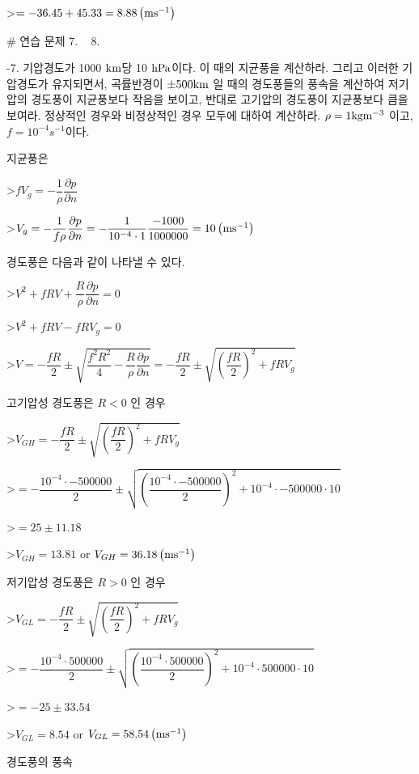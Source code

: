 >$ = -36.45+ 45.33 = 8.88 \left( \rm m s^{-1} \right)$




# 연습 문제 7. ~ 8. 


-7. 기압경도가 1000 $\rm km$당 10 $\rm hPa $이다. 이 때의 지균풍을 계산하라. 그리고 이러한 기압경도가 유지되면서, 곡률반경이 $\pm 500 \rm km$ 일 때의 경도풍들의 풍속을 계산하여 저기압의 경도풍이 지균풍보다 작음을 보이고, 반대로 고기압의 경도풍이 지균풍보다 큼을 보여라. 정상적인 경우와 비정상적인 경우 모두에 대하여 계산하라. $\rho = 1 \rm kg m^{-3}$ 이고, $ f = 10^{-4} s^{-1}$이다. 


지균풍은 

>$f V_{g} = -\dfrac{1}{\rho}\dfrac{\partial p}{\partial n}$ 

>$V_{g} = -\dfrac{1}{f \rho}\dfrac{\partial p}{\partial n} =  -\dfrac{1}{10^{-4} \cdot 1}\dfrac{-1000}{1000000} = 10 \left( \rm m s^{-1} \right)$ 

경도풍은 다음과 같이 나타낼 수 있다.

>$ V^{2} + fRV + \dfrac{R}{\rho} \dfrac{\partial p}{\partial n} = 0$

>$ V^{2} + fRV - f R V_{g} = 0$

>$ V = -\dfrac{fR}{2} \pm \sqrt{ \dfrac{f^{2} R^{2}}{4} - \dfrac{R}{\rho}\dfrac{\partial p}{\partial n} } = -\dfrac{fR}{2} \pm \sqrt{ {\left(\dfrac{f R}{2} \right)}^{2} + f R V_{g} }$

고기압성 경도풍은 $ R < 0$ 인 경우

>$ V_{GH} = -\dfrac{fR}{2} \pm \sqrt{ {\left(\dfrac{f R}{2} \right)}^{2} + f R V_{g} }$

>$= -\dfrac{10^{-4} \cdot -500000}{2} \pm \sqrt{ {\left(\dfrac{10^{-4} \cdot -500000}{2} \right)}^{2} + 10^{-4} \cdot -500000 \cdot 10 }$

>$= 25 \pm 11.18 $

>$V_{GH} =13.81 $ or $V_{GH} = 36.18 \left( \rm m s^{-1} \right)$

저기압성 경도풍은  $ R > 0$ 인 경우

>$ V_{GL} = -\dfrac{fR}{2} \pm \sqrt{ {\left(\dfrac{f R}{2} \right)}^{2} + f R V_{g} }$

>$= -\dfrac{10^{-4} \cdot 500000}{2} \pm \sqrt{ {\left(\dfrac{10^{-4} \cdot 500000}{2} \right)}^{2} + 10^{-4} \cdot 500000 \cdot 10 }$

>$= -25 \pm 33.54 $

>$V_{GL} =8.54 $ or $V_{GL} = 58.54 \left( \rm m s^{-1} \right)$


경도풍의 풍속

